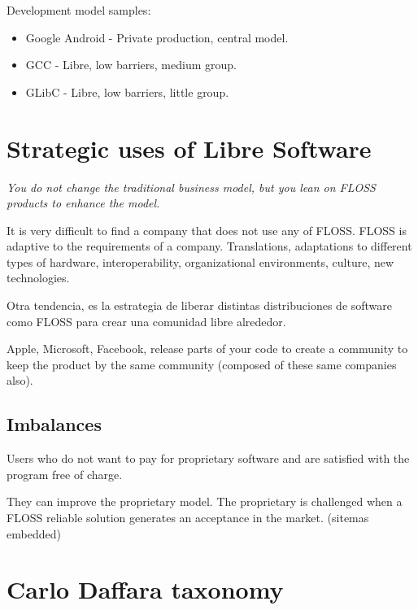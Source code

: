 Development model samples:
\begin{itemize}
  \item Google Android - Private production, central model.
  \item GCC - Libre, low barriers, medium group.
  \item GLibC - Libre, low barriers, little group.
\end{itemize}

\section{Strategic uses of Libre Software}

\emph{You do not change the traditional business model, but you lean on FLOSS
 products to enhance the model.}

It is very difficult to find a company that does not use any of FLOSS. 
FLOSS is adaptive to the requirements of a company. 
Translations, adaptations to different types of hardware, interoperability, 
organizational environments, culture, new technologies.

Otra tendencia, es la estrategia de liberar distintas distribuciones de 
software como FLOSS para crear una comunidad libre alrededor.

Apple, Microsoft, Facebook, release parts of your code to create a community to 
keep the product by the same community (composed of these same companies also).

\subsection{Imbalances}

Users who do not want to pay for proprietary software and are satisfied with 
the program free of charge.

They can improve the proprietary model. The proprietary is challenged when a 
FLOSS reliable solution generates an acceptance in the market. (sitemas embedded)

\section{Carlo Daffara taxonomy}

